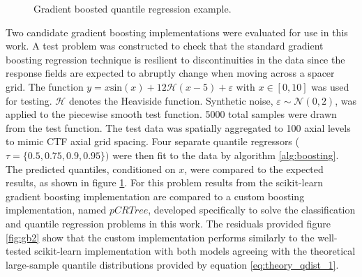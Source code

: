 

\begin{figure}[H]%
    \centering
    \qquad
    \qquad
    \qquad
    \qquad
    \caption[Gradient boosted quantile regression example.]{Gradient boosted quantile regression example.}%
    \label{fig:gb1}%
\end{figure}

Two candidate gradient boosting implementations were evaluated for use in this work.  A test problem was constructed to check that the standard gradient boosting regression technique is resilient to discontinuities in the data since the response fields are expected to abruptly change when moving across a spacer grid.  The function $y = x \mathrm{sin}(x) +12 \mathcal H(x-5)+\varepsilon$ with $x\in [0,10]$ was used for testing.  $\mathcal H$ denotes the Heaviside function. Synthetic noise, $\varepsilon \sim \mathcal N(0,2)$, was applied to the piecewise smooth test function.   5000 total samples were drawn from the test function. The test data was spatially aggregated to 100 axial levels to mimic CTF axial grid spacing.  Four separate quantile regressors ($\tau = \{0.5, 0.75, 0.9, 0.95 \})$ were then fit to the data by algorithm \ref{alg:boosting}. The predicted quantiles, conditioned on $x$, were compared to the expected results, as shown in figure \ref{fig:gb1}. For this problem results from the scikit-learn gradient boosting implementation are compared to a custom boosting implementation, named $pCRTree$, developed specifically to solve the classification and quantile regression problems in this work.  The residuals provided figure \ref{fig:gb2} show that the custom implementation performs similarly to the well-tested scikit-learn implementation with both models agreeing with the theoretical large-sample quantile distributions provided by equation \ref{eq:theory_qdist_1}.

